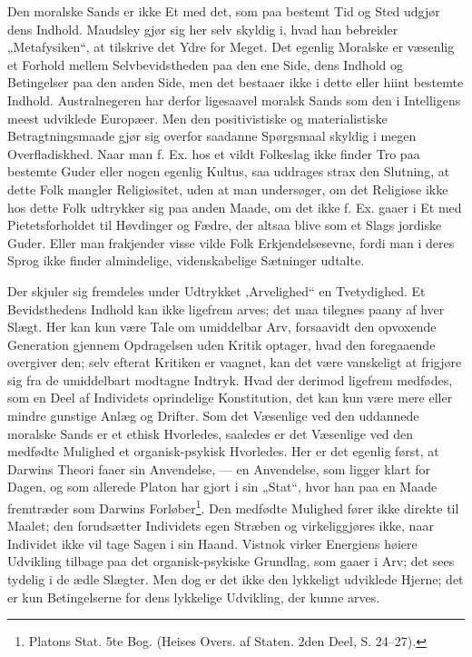 \documentclass[12pt,a4paper,openany]{book}
\newcommand{\opage}[1]{\marginnote{\footnotesize\textit{[#1]}}}
\begin{document}
\opage{329}Den moralske Sands er ikke Et med det, som paa bestemt
Tid og Sted udgjør dens Indhold. Maudsley gjør
sig her selv skyldig i, hvad han bebreider „Metafysiken“, at
tilskrive det Ydre for Meget. Det egenlig Moralske er
væsenlig et Forhold mellem Selvbevidstheden paa den ene
Side, dens Indhold og Betingelser paa den anden Side,
men det bestaaer ikke i dette eller hiint bestemte Indhold. Australnegeren
har derfor ligesaavel moralsk Sands som den i
Intelligens meest udviklede Europæer. Men den positivistiske
og materialistiske Betragtningsmaade gjør sig overfor
saadanne Spørgsmaal skyldig i megen Overfladiskhed. Naar
man f. Ex. hos et vildt Folkeslag ikke finder Tro paa
bestemte Guder eller nogen egenlig Kultus, saa uddrages
strax den Slutning, at dette Folk mangler Religiøsitet, uden
at man undersøger, om det Religiøse ikke hos dette Folk udtrykker
sig paa anden Maade, om det ikke f. Ex. gaaer i
Et med Pietetsforholdet til Høvdinger og Fædre, der altsaa
blive som et Slags jordiske Guder. Eller man frakjender
visse vilde Folk Erkjendelsesevne, fordi man i deres Sprog
ikke finder almindelige, videnskabelige Sætninger udtalte.

Der skjuler sig fremdeles under Udtrykket ‚Arvelighed“
en Tvetydighed. Et Bevidsthedens Indhold kan ikke ligefrem
arves; det maa tilegnes paany af hver Slægt. Her
kan kun være Tale om umiddelbar Arv, forsaavidt den opvoxende
Generation gjennem Opdragelsen uden Kritik optager,
hvad den foregaaende overgiver den; selv efterat Kritiken er
vaagnet, kan det være vanskeligt at frigjøre sig fra de umiddelbart
modtagne Indtryk. Hvad der derimod ligefrem medfødes,
som en Deel af Individets oprindelige Konstitution,
det kan kun være mere eller mindre gunstige Anlæg og
Drifter. Som det Væsenlige ved den uddannede moralske
Sands er et ethisk Hvorledes, saaledes er det Væsenlige ved
den medfødte Mulighed et organisk-psykisk Hvorledes. Her
er det egenlig først, at Darwins Theori faaer sin Anvendelse,
--- en Anvendelse, som ligger klart for Dagen, og
som allerede Platon har gjort i sin „Stat“, hvor han paa
\opage{330}en Maade fremtræder som Darwins Forløber\footnote{Platons Stat. 5te Bog. (Heises Overs. af Staten. 2den Deel, S. 24--27).}. Den medfødte
Mulighed fører ikke direkte til Maalet; den forudsætter
Individets egen Stræben og virkeliggjøres ikke, naar Individet
ikke vil tage Sagen i sin Haand. Vistnok virker Energiens
høiere Udvikling tilbage paa det organisk-psykiske
Grundlag, som gaaer i Arv; det sees tydelig i de ædle
Slægter. Men dog er det ikke den lykkeligt udviklede Hjerne;
det er kun Betingelserne for dens lykkelige Udvikling, der
kunne arves.
\end{document}
